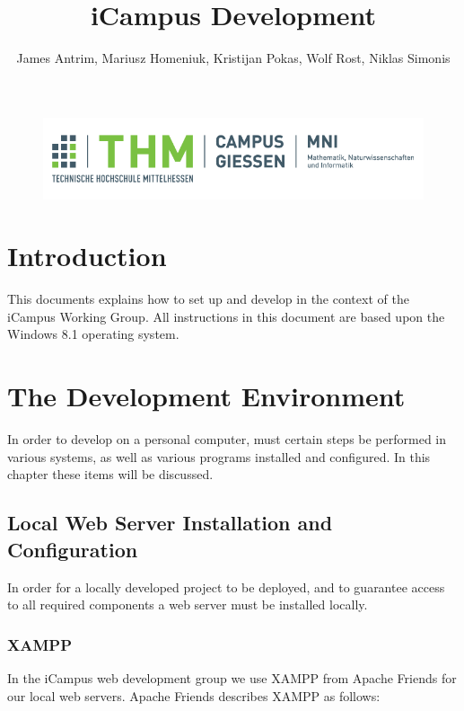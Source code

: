 \documentclass[]{report}
\begin{document}
\title{iCampus Development}
\author{James Antrim, Mariusz Homeniuk, Kristijan Pokas, Wolf Rost, Niklas Simonis}

\begin{figure}
\includegraphics[width=14cm]{thm.png}
\maketitle
\end{figure}

\newpage
\tableofcontents

\chapter{Introduction}

This documents explains how to set up and develop in the context of the iCampus Working Group. All instructions in this document are based upon the Windows 8.1 operating system.

\chapter{The Development Environment}

In order to develop on a personal computer, must certain steps be performed in various systems, as well as various programs installed and configured. In this chapter these items will be discussed.

\section{Local Web Server Installation and Configuration}

In order for a locally developed project to be deployed, and to guarantee access to all required components a web server must be installed locally. 

\subsection{XAMPP}

In the iCampus web development group we use XAMPP from Apache Friends for our local web servers. Apache Friends describes XAMPP as follows:
\end{document}
